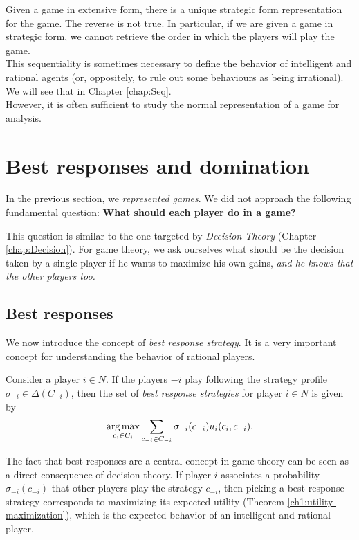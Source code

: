 Given a game in extensive form, there is a unique strategic form representation for the game. The reverse is not true. In particular, if we are given a game in strategic form, we cannot retrieve the order in which the players will play the game.\\
This sequentiality is sometimes necessary to define the behavior of intelligent and rational agents (or, oppositely, to rule out some behaviours as being irrational).  We will see that in Chapter \ref{chap:Seq}. \\
However, it is often sufficient to study the normal representation of a game for analysis.

\section{Best responses and domination}

In the previous section, we \emph{represented games}. We did not approach the following fundamental question:
 \textbf{What should each player do in a game?}

This question is similar to the one targeted by \emph{Decision Theory} (Chapter \ref{chap:Decision}).
For game theory, we ask ourselves what should be the decision taken by a single player if he wants to maximize his own gains, \emph{and he knows that the other players too.}





\subsection{Best responses}
\label{chap2:subsec:BR}
We now introduce the concept of \emph{best response strategy}. It is a very important concept for understanding the behavior of rational players.

\begin{definition}
Consider a player $i \in N$. If the players $-i$ play following the strategy profile $\sigma_{-i} \in \Delta(C_{-i})$, then the set of \emph{best response strategies} for player $i \in N$ is given by
$$ \operatorname*{arg\,max}_{c_i \in C_i} \sum_{c_{-i} \in C_{-i}} \sigma_{-i}(c_{-i}) u_i(c_i, c_{-i}).$$
\end{definition}

The fact that best responses are a central concept in game theory can be seen as a direct consequence of decision theory. If player $i$ associates a probability $\sigma_{-i}(c_{-i}) $ that other players play the strategy $c_{-i}$, then picking a best-response strategy corresponds to maximizing its expected utility (Theorem \ref{ch1:utility-maximization}), which is the expected behavior of an intelligent and rational player.

